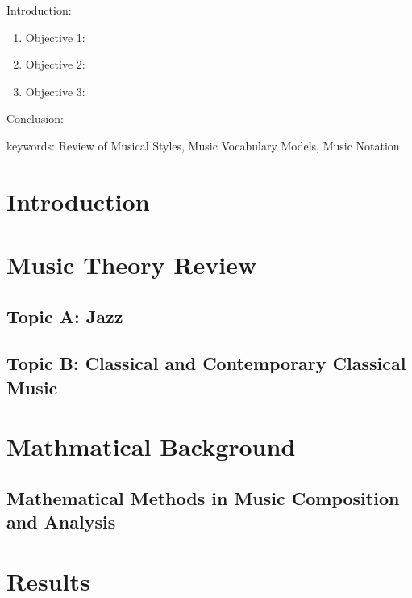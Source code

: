 


\twocolumn
\scriptsize
\begin{frontmatter}
		\title{}
		\author{}
		\address{The Mathematical Learning Space}
\end{frontmatter}	

Introduction:
\begin{enumerate}
\item Objective 1:
\item Objective 2:
\item Objective 3:
\end{enumerate}
Conclusion:

keywords: Review of Musical Styles, Music Vocabulary Models, Music Notation


\section{Introduction}


\section{Music Theory Review}

\subsection{Topic A: Jazz}

\subsection{Topic B: Classical and Contemporary Classical Music}

\section{Mathmatical Background}

\subsection{Mathematical Methods in Music Composition and Analysis}

\section{Results}

